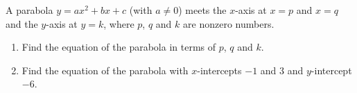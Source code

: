 A parabola $y=ax^2+bx+c$ (with $a\ne0$) meets the $x$-axis at $x=p$ and $x=q$ and the $y$-axis at $y=k$, where $p$, $q$ and $k$ are nonzero numbers.
\begin{enumerate}
\item[(a)] Find the equation of the parabola in terms of $p$, $q$ and $k$.
\item[(b)] Find the equation of the parabola with $x$-intercepts $-1$ and $3$ and $y$-intercept $-6$.
\end{enumerate}
